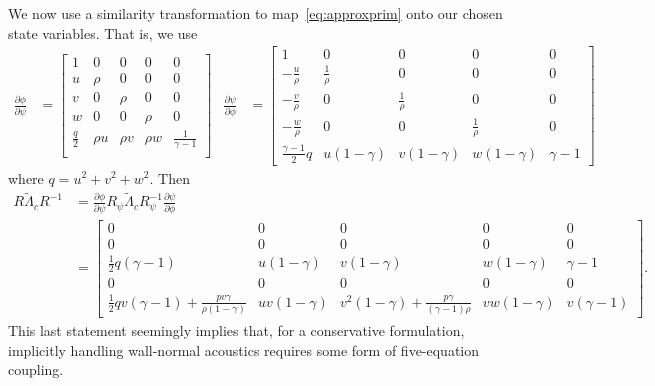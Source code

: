 \documentclass[letterpaper,11pt,nointlimits,reqno]{amsart}
\begin{document}
We now use a similarity transformation to map~\eqref{eq:approxprim} onto our
chosen state variables.  That is, we use
\begin{align}
  \frac{\partial \phi}{\partial \psi}
  &=
 \begin{bmatrix}
  1                      & 0      & 0      & 0      &  0                  \\
  u                      & \rho   & 0      & 0      &  0                  \\
  v                      & 0      & \rho   & 0      &  0                  \\
  w                      & 0      & 0      & \rho   &  0                  \\
  \frac{q}{2}  & \rho u & \rho v & \rho w &  \frac{1}{\gamma-1} \\
 \end{bmatrix}
&
  \frac{\partial \psi}{\partial \phi}
  &=
 \begin{bmatrix}
 1 & 0 & 0 & 0 & 0 \\
 -\frac{u}{\rho } & \frac{1}{\rho } & 0 & 0 & 0 \\
 -\frac{v}{\rho } & 0 & \frac{1}{\rho } & 0 & 0 \\
 -\frac{w}{\rho } & 0 & 0 & \frac{1}{\rho } & 0 \\
 \frac{\gamma-1}{2} q  & u(1-\gamma) & v(1-\gamma) & w(1-\gamma) & \gamma-1
 \end{bmatrix}
\end{align}
where $q=u^2+v^2+w^2$.  Then
\begin{align}
 R \tilde\Lambda_c R^{-1}
 &=
  \frac{\partial \phi}{\partial \psi}
 R_\psi \tilde\Lambda_c R_\psi^{-1}
  \frac{\partial \psi}{\partial \phi}
\\
 &=
\begin{bmatrix}
 0 & 0 & 0 & 0 & 0 \\
 0 & 0 & 0 & 0 & 0 \\
 \frac{1}{2} q (\gamma-1) & u(1-\gamma)  & v(1-\gamma)  & w(1-\gamma)  & \gamma-1  \\
 0 & 0 & 0 & 0 & 0 \\
 \frac{1}{2} q v (\gamma-1 )+\frac{p v \gamma }{\rho(1-\gamma) } & u v (1-\gamma ) & v^2 (1-\gamma )+\frac{p \gamma }{(\gamma-1) \rho } & v w (1-\gamma ) & v (\gamma-1 )
\end{bmatrix}
.
\end{align}
This last statement seemingly implies that, for a conservative formulation,
implicitly handling wall-normal acoustics requires some form of five-equation
coupling.
\end{document}
